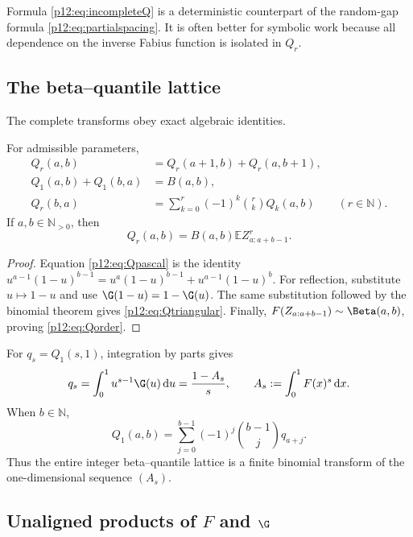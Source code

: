 \documentclass[11pt,oneside]{article}
\theoremstyle{definition}
\theoremstyle{remark}
\newcommand{\F}{F}
\newcommand{\E}{\mathbb E}
\newcommand{\N}{\mathbb N}
\newcommand{\dd}{\,\mathrm d}
\newcommand{\1}{\mathbf 1}
\begin{document}
Formula \eqref{p12:eq:incompleteQ} is a deterministic counterpart of the random-gap
formula \eqref{p12:eq:partialspacing}.  It is often better for symbolic work because
all dependence on the inverse Fabius function is isolated in \(Q_r\).

\subsection{The beta--quantile lattice}

The complete transforms obey exact algebraic identities.

\begin{proposition}
For admissible parameters,
\begin{align}
 Q_r(a,b)&=Q_r(a+1,b)+Q_r(a,b+1),\label{p12:eq:Qpascal}\\
 Q_1(a,b)+Q_1(b,a)&=B(a,b),\label{p12:eq:Qreflection}\\
 Q_r(b,a)&=\sum_{k=0}^r(-1)^k\binom rk Q_k(a,b)
 \qquad(r\in\N).\label{p12:eq:Qtriangular}
\end{align}
If \(a,b\in\N_{>0}\), then
\begin{equation}\label{p12:eq:Qorder}
 Q_r(a,b)=B(a,b)\E Z_{a:a+b-1}^r.
\end{equation}
\end{proposition}

\begin{proof}
Equation \eqref{p12:eq:Qpascal} is the identity
\(u^{a-1}(1-u)^{b-1}=u^a(1-u)^{b-1}+u^{a-1}(1-u)^b\).
For reflection, substitute \(u\mapsto1-u\) and use
\(\G(1-u)=1-\G(u)\).  The same substitution followed by the binomial theorem
gives \eqref{p12:eq:Qtriangular}.  Finally,
\(\F(Z_{a:a+b-1})\sim\Beta(a,b)\), proving \eqref{p12:eq:Qorder}.
\end{proof}

For \(q_s=Q_1(s,1)\), integration by parts gives
\begin{equation}\label{p12:eq:qA}
 q_s=\int_0^1u^{s-1}\G(u)\dd u=\frac{1-A_s}{s},
 \qquad A_s:=\int_0^1\F(x)^s\dd x.
\end{equation}
When \(b\in\N\),
\begin{equation}\label{p12:eq:Qfinitediff}
 Q_1(a,b)=\sum_{j=0}^{b-1}(-1)^j\binom{b-1}{j}q_{a+j}.
\end{equation}
Thus the entire integer beta--quantile lattice is a finite binomial transform of
the one-dimensional sequence \((A_s)\).

\subsection{Unaligned products of \(\F\) and \(\G\)}
\end{document}
